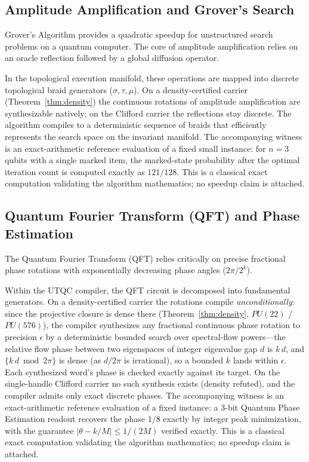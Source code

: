 \subsection{Amplitude Amplification and Grover's Search}
Grover's Algorithm provides a quadratic speedup for unstructured search problems on a quantum computer. The core of amplitude amplification relies on an oracle reflection followed by a global diffusion operator.

In the topological execution manifold, these operations are mapped into discrete topological braid generators ($\sigma, \tau, \mu$). On a density-certified carrier (Theorem~\ref{thm:density}) the continuous rotations of amplitude amplification are synthesizable natively; on the Clifford carrier the reflections stay discrete. The algorithm compiles to a deterministic sequence of braids that efficiently represents the search space on the invariant manifold. The accompanying witness is an exact-arithmetic reference evaluation of a fixed small instance: for $n = 3$ qubits with a single marked item, the marked-state probability after the optimal iteration count is computed exactly as $121/128$. This is a classical exact computation validating the algorithm mathematics; no speedup claim is attached.

\subsection{Quantum Fourier Transform (QFT) and Phase Estimation}
The Quantum Fourier Transform (QFT) relies critically on precise fractional phase rotations with exponentially decreasing phase angles ($2\pi/2^k$). 

Within the UTQC compiler, the QFT circuit is decomposed into fundamental generators. On a density-certified carrier the rotations compile \emph{unconditionally}: since the projective closure is dense there (Theorem~\ref{thm:density}, $PU(22)$ / $PU(576)$), the compiler synthesizes any fractional continuous phase rotation to precision $\epsilon$ by a deterministic bounded search over spectral-flow powers---the relative flow phase between two eigenspaces of integer eigenvalue gap $d$ is $k\,d$, and $\{k\,d \bmod 2\pi\}$ is dense (as $d/2\pi$ is irrational), so a bounded $k$ lands within $\epsilon$. Each synthesized word's phase is checked exactly against its target. On the single-handle Clifford carrier no such synthesis exists (density refuted), and the compiler admits only exact discrete phases. The accompanying witness is an exact-arithmetic reference evaluation of a fixed instance: a 3-bit Quantum Phase Estimation readout recovers the phase $1/8$ exactly by integer peak minimization, with the guarantee $|\theta - k/M| \le 1/(2M)$ verified exactly. This is a classical exact computation validating the algorithm mathematics; no speedup claim is attached.

